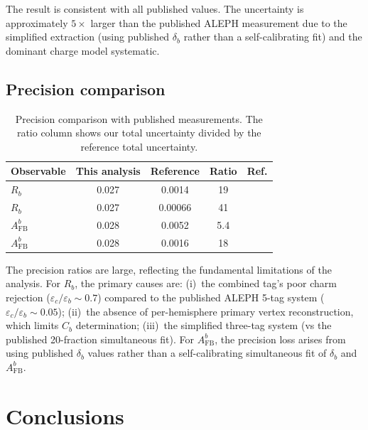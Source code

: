 \documentclass[11pt,a4paper]{article}
\begin{document}
The result is consistent with all published values.  The uncertainty is
approximately $5\times$ larger than the published ALEPH measurement due
to the simplified extraction (using published $\delta_b$ rather than a
self-calibrating fit) and the dominant charge model systematic.

\subsection{Precision comparison}

\begin{table}[htbp]
\centering
\caption{Precision comparison with published measurements.  The ratio
  column shows our total uncertainty divided by the reference total
  uncertainty.}
\label{tbl:precision}
\begin{tabular}{lcccc}
\toprule
Observable & This analysis & Reference & Ratio & Ref. \\
\midrule
$R_b$ & 0.027 & 0.0014 & 19 & \cite{ALEPH:Rb:1996} \\
$R_b$ & 0.027 & 0.00066 & 41 & \cite{LEP:EWWG:2005} \\
$A_\mathrm{FB}^b$ & 0.028 & 0.0052 & 5.4 & \cite{ALEPH:AFBb} \\
$A_\mathrm{FB}^b$ & 0.028 & 0.0016 & 18 & \cite{LEP:EWWG:2005} \\
\bottomrule
\end{tabular}
\end{table}

The precision ratios are large, reflecting the fundamental limitations of
the analysis.  For $R_b$, the primary causes are:
(i)~the combined tag's poor charm rejection ($\varepsilon_c/\varepsilon_b
\sim 0.7$) compared to the published ALEPH 5-tag system
($\varepsilon_c/\varepsilon_b \sim 0.05$);
(ii)~the absence of per-hemisphere primary vertex reconstruction, which
limits $C_b$ determination;
(iii)~the simplified three-tag system (vs the published 20-fraction
simultaneous fit).  For $A_\mathrm{FB}^b$, the precision loss arises from
using published $\delta_b$ values rather than a self-calibrating
simultaneous fit of $\delta_b$ and $A_\mathrm{FB}^b$.

\section{Conclusions}
\label{sec:conclusions}
\end{document}
